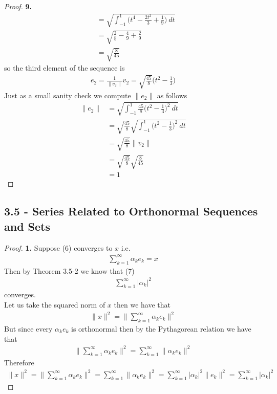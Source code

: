 \documentclass[11pt]{article}
\theoremstyle{definition}
\begin{document}
\begin{proof}{\textbf{9.}}
\begin{align*}
    &= \sqrt{\int_{-1}^1 \bigg(t^4 - \frac{2t^2}{3} + \frac{1}{9}\bigg)~dt}\\
    &= \sqrt{\frac{2}{5} - \frac{4}{9} + \frac{2}{9}}\\
    &= \sqrt{\frac{8}{45}}
\end{align*}
so the third element of the sequence is
\begin{align*}
    e_2 = \frac{1}{\|v_2\|}v_2
    = \sqrt{\frac{45}{8}}\bigg(t^2 - \frac{1}{3}\bigg)
\end{align*}
Just as a small sanity check we compute $\|e_2\|$ as follows
\begin{align*}
    \|e_2\| &= \sqrt{\int_{-1}^1 \frac{45}{8}\bigg(t^2 - \frac{1}{3}\bigg)^2~dt}\\
    &= \sqrt{\frac{45}{8}}\sqrt{\int_{-1}^1 \bigg(t^2 - \frac{1}{3}\bigg)^2~dt}\\
    &= \sqrt{\frac{45}{8}}\|v_2\|\\
    &= \sqrt{\frac{45}{8}}\sqrt{\frac{8}{45}}\\
    &= 1
\end{align*}
\end{proof}

\cleardoublepage
\subsection*{3.5 - Series Related to Orthonormal Sequences and Sets}
\begin{proof}{\textbf{1.}}
Suppose (6) converges to $x$ i.e.
\begin{align*}
    \sum_{k=1}^\infty \alpha_ke_k = x
\end{align*}
Then by Theorem 3.5-2 we know that (7)
\begin{align*}
    \sum_{k=1}^\infty |\alpha_k|^2
\end{align*}
converges.
\\
Let us take the squared norm of $x$ then we have that
\begin{align*}
    \|x\|^2 = \bigg\|\sum_{k=1}^\infty \alpha_ke_k\bigg\|^2
\end{align*}
But since every $\alpha_ke_k$ is orthonormal then by the Pythagorean relation
we have that
\begin{align*}
    \bigg\|\sum_{k=1}^\infty \alpha_ke_k\bigg\|^2
    = \sum_{k =1}^\infty \|\alpha_ke_k\|^2
\end{align*}
Therefore
\begin{align*}
    \|x\|^2 = \bigg\|\sum_{k=1}^\infty \alpha_ke_k\bigg\|^2
    = \sum_{k =1}^\infty \|\alpha_ke_k\|^2
    = \sum_{k =1}^\infty |\alpha_k|^2\|e_k\|^2
    = \sum_{k =1}^\infty |\alpha_k|^2
\end{align*}
\end{proof}
\end{document}
